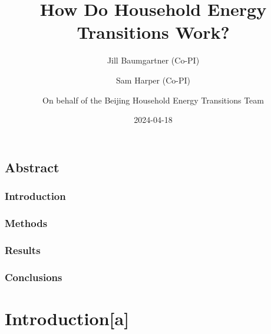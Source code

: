 \documentclass[
  letterpaper,
  DIV=11,
  numbers=noendperiod]{scrartcl}
\title{How Do Household Energy Transitions Work?}
\author{Jill Baumgartner (Co-PI) \and Sam Harper (Co-PI) \and On behalf
of the Beijing Household Energy Transitions Team}
\date{2024-04-18}
\renewcommand*\contentsname{Table of contents}
\newcommand\contentsname{Table of contents}
\begin{document}
\maketitle
\ifdefined\Shaded\renewenvironment{Shaded}{\begin{tcolorbox}[interior hidden, frame hidden, enhanced, sharp corners, breakable, boxrule=0pt, borderline west={3pt}{0pt}{shadecolor}]}{\end{tcolorbox}}\fi

\renewcommand*\contentsname{Table of contents}
{
\hypersetup{linkcolor=}
\setcounter{tocdepth}{3}
\tableofcontents
}
\hypertarget{abstract}{%
\subsection*{Abstract}\label{abstract}}

\hypertarget{introduction}{%
\subsubsection*{Introduction}\label{introduction}}

\hypertarget{methods}{%
\subsubsection*{Methods}\label{methods}}

\hypertarget{results}{%
\subsubsection*{Results}\label{results}}

\hypertarget{conclusions}{%
\subsubsection*{Conclusions}\label{conclusions}}

\hypertarget{introductiona}{%
\section{Introduction{[}a{]}}\label{introductiona}}
\end{document}
